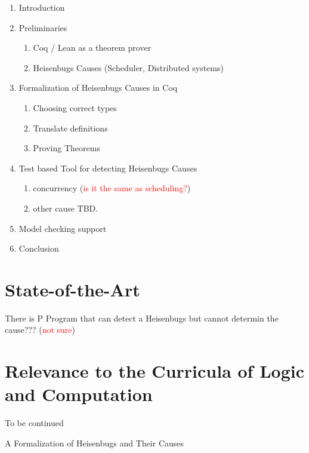 \documentclass[12pt, a4paper]{article}
\begin{document}
\begin{enumerate}
    \item Introduction
    \item Preliminaries
    \begin{enumerate}
        \item Coq / Lean as a theorem prover
        \item Heisenbugs Causes (Scheduler, Distributed systems)
    \end{enumerate}
    \item Formalization of Heisenbugs Causes in Coq
    \begin{enumerate}
        \item Choosing correct types
        \item Translate definitions
        \item Proving Theorems
    \end{enumerate}
    \item Test based Tool for detecting Heisenbugs Causes
    \begin{enumerate}
        \item concurrency (\textcolor{red}{is it the same as scheduling?})
        \item other cause TBD.
    \end{enumerate}
    \item Model checking support
    \item Conclusion
\end{enumerate}

\newpage

\section{State-of-the-Art}
There is P Program that can detect a Heisenbugs but cannot determin the cause??? (\textcolor{red}{not sure})
\newpage

\section{Relevance to the Curricula of Logic and Computation}
To be continued
\newpage

\begin{thebibliography}{9}
A Formalization of Heisenbugs and Their Causes
\end{thebibliography}
\end{document}
